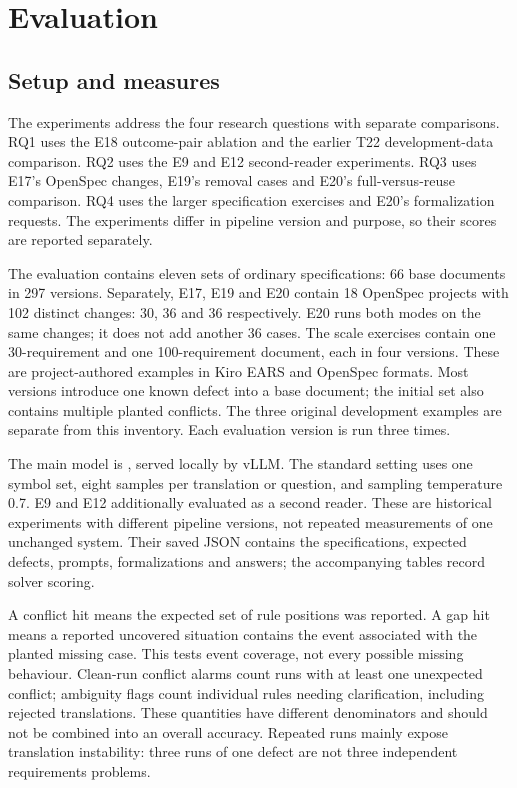 \section{Evaluation}\label{sec:evaluation}

\subsection{Setup and measures}\label{sec:experimental-setup}

The experiments address the four research questions with separate comparisons. RQ1 uses the E18 outcome-pair ablation and the earlier T22 development-data comparison. RQ2 uses the E9 and E12 second-reader experiments. RQ3 uses E17's OpenSpec changes, E19's removal cases and E20's full-versus-reuse comparison. RQ4 uses the larger specification exercises and E20's formalization requests. The experiments differ in pipeline version and purpose, so their scores are reported separately.

The evaluation contains eleven sets of ordinary specifications: 66 base
documents in 297 versions. Separately, E17, E19 and E20 contain 18 OpenSpec projects with
102 distinct changes: 30, 36 and 36 respectively. E20 runs both modes on the same changes; it does not add another 36 cases. The scale exercises contain one 30-requirement and one
100-requirement document, each in four versions. These are project-authored
examples in Kiro EARS and OpenSpec formats. Most versions introduce one known
defect into a base document; the initial set also contains multiple planted
conflicts. The three original development examples are separate from this
inventory. Each evaluation version is run three times.

The main model is , served locally by vLLM. The
standard setting uses one symbol set, eight samples per translation or
question, and sampling temperature 0.7. E9 and E12 additionally evaluated
 as a second reader. These are historical experiments
with different pipeline versions, not repeated measurements of one unchanged
system. Their saved JSON contains the specifications, expected defects, prompts,
formalizations and answers; the accompanying tables record solver scoring.

A conflict hit means the expected set of rule positions was reported. A gap
hit means a reported uncovered situation contains the event associated with
the planted missing case. This tests event coverage, not every possible missing
behaviour. Clean-run conflict alarms count runs with at least one unexpected
conflict; ambiguity flags count individual rules needing clarification,
including rejected translations. These quantities have
different denominators and should not be combined into an overall accuracy.
Repeated runs mainly expose translation instability: three runs of one defect
are not three independent requirements problems.



